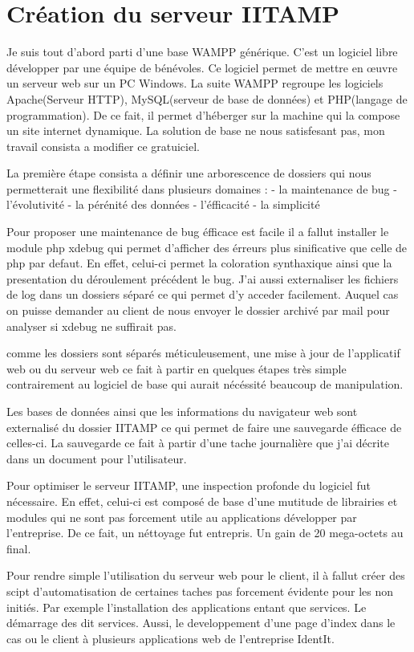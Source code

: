\chapter{Création du serveur IITAMP} %
\label{cha:Création du serveur IITAMP}

Je suis tout d'abord parti d'une base WAMPP générique. C'est un logiciel
libre développer par une équipe de bénévoles. Ce logiciel permet de
mettre en \oe{}uvre un serveur web sur un PC Windows. La suite WAMPP
regroupe les logiciels Apache(Serveur HTTP), MySQL(serveur de base de
données) et PHP(langage de programmation). De ce fait, il permet
d'héberger sur la machine qui la compose un site internet dynamique. La
solution de base ne nous satisfesant pas, mon travail consista a
modifier ce gratuiciel.

La première étape consista a définir une arborescence de dossiers qui
nous permetterait une flexibilité dans plusieurs domaines :
- la maintenance de bug
- l'évolutivité
- la pérénité des données
- l'éfficacité
- la simplicité

Pour proposer une maintenance de bug éfficace est facile il a fallut
installer le module php xdebug qui permet d'afficher des érreurs plus
sinificative que celle de php par defaut. En effet, celui-ci permet la
coloration synthaxique ainsi que la presentation du déroulement
précédent le bug. J'ai aussi externaliser les fichiers de log dans un
dossiers séparé ce qui permet d'y acceder facilement. Auquel cas on
puisse demander au client de nous envoyer le dossier archivé par mail
pour analyser si xdebug ne suffirait pas.

comme les dossiers sont séparés méticuleusement, une mise à jour de
l'applicatif web ou du serveur web ce fait à partir en quelques étapes
très simple contrairement au logiciel de base qui aurait nécéssité
beaucoup de manipulation.

Les bases de données ainsi que les informations du navigateur web sont
externalisé du dossier IITAMP ce qui permet de faire une sauvegarde
éfficace de celles-ci. La sauvegarde ce fait à partir d'une tache
journalière que j'ai décrite dans un document pour l'utilisateur.

Pour optimiser le serveur IITAMP, une inspection profonde du logiciel
fut nécessaire. En effet, celui-ci est composé de base d'une mutitude de
librairies et modules qui ne sont pas forcement utile au applications
développer par l'entreprise. De ce fait, un néttoyage fut entrepris. Un
gain de 20 mega-octets au final.

Pour rendre simple l'utilisation du serveur web pour le client, il à
fallut créer des scipt d'automatisation de certaines taches pas
forcement évidente pour les non initiés. Par exemple l'installation des
applications entant que services. Le démarrage des dit services. Aussi,
le developpement d'une page d'index dans le cas ou le client à plusieurs
applications web de l'entreprise IdentIt.

